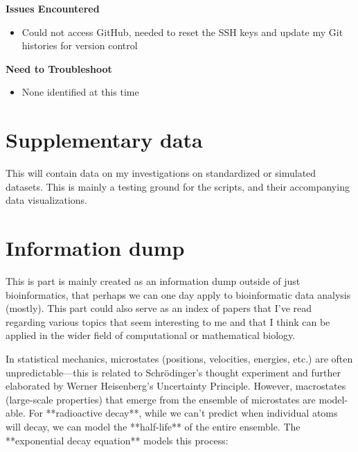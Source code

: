 \documentclass[11pt]{report}
\newcommand{\done}{\checkmark}
\begin{document}
{\textbf{Issues Encountered}
\begin{itemize}
	\item [\done] Could not access GitHub, needed to reset the SSH keys and update my Git histories for version control
\end{itemize}

\textbf{Need to Troubleshoot}
\begin{itemize}
	\item None identified at this time
\end{itemize}


\newpage
\onecolumn


\newpage
\pagestyle{fancy}
\fancyhf{}
\fancyhead[C]{\leftmark}  %
\fancyhead[R]{\thepage}

\part{Supplementary data}
This will contain data on my investigations on standardized or simulated datasets. This is mainly a testing ground for the scripts, and their accompanying data visualizations. 

\renewcommand{\thesection}{\arabic{section}}
\setcounter{section}{0}
\setcounter{subsection}{0}


\part{Information dump}
This is part is mainly created as an information dump outside of just bioinformatics, that perhaps we can one day apply to bioinformatic data analysis (mostly). This part could also serve as an index of papers that I've read regarding various topics that seem interesting to me and that I think can be applied in the wider field of computational or mathematical biology. 



\begin{tcolorbox}[title=Exponential Decay and Biological Gene Expression, coltitle=AntiqueWhite1] In statistical mechanics, microstates (positions, velocities, energies, etc.) are often unpredictable—this is related to Schrödinger's thought experiment and further elaborated by Werner Heisenberg’s Uncertainty Principle. However, macrostates (large-scale properties) that emerge from the ensemble of microstates are model-able.
	For **radioactive decay**, while we can’t predict when individual atoms will decay, we can model the **half-life** of the entire ensemble. The **exponential decay equation** models this process:
	

\end{tcolorbox}}
\end{document}
